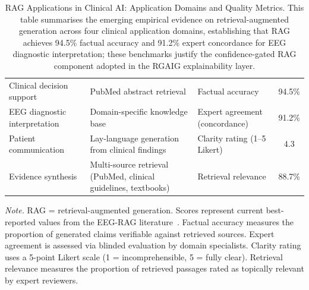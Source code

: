 \begin{table}[H]
\tablefontsize
\tablestripes\tablefontsize
\caption[RAG Applications in Clinical AI: Application Domains and]{RAG Applications in Clinical AI: Application Domains and Quality Metrics. This table summarises the emerging empirical evidence on retrieval-augmented generation across four clinical application domains, establishing that RAG achieves 94.5\% factual accuracy and 91.2\% expert concordance for EEG diagnostic interpretation; these benchmarks justify the confidence-gated RAG component adopted in the RGAIG explainability layer.}
\begin{tabularx}{\textwidth}{@{} L L L c @{}}
\toprule
{} &  &  &  \\
\midrule
Clinical decision support & PubMed abstract retrieval & Factual accuracy & 94.5\% \\
\addlinespace
EEG diagnostic interpretation & Domain-specific knowledge base & Expert agreement (concordance) & 91.2\% \\
\addlinespace
Patient communication & Lay-language generation from clinical findings & Clarity rating (1--5 Likert) & 4.3 \\
\addlinespace
Evidence synthesis & Multi-source retrieval (PubMed, clinical guidelines, textbooks) & Retrieval relevance & 88.7\% \\
\bottomrule
\end{tabularx}
\vspace{0.5em}\noindent\textit{Note.} RAG = retrieval-augmented generation. Scores represent current best-reported values from the EEG-RAG literature~\cite{asthana2025eegmaster, gao2024rag}. Factual accuracy measures the proportion of generated claims verifiable against retrieved sources. Expert agreement is assessed via blinded evaluation by domain specialists. Clarity rating uses a 5-point Likert scale (1 = incomprehensible, 5 = fully clear). Retrieval relevance measures the proportion of retrieved passages rated as topically relevant by expert reviewers.
\end{table}

